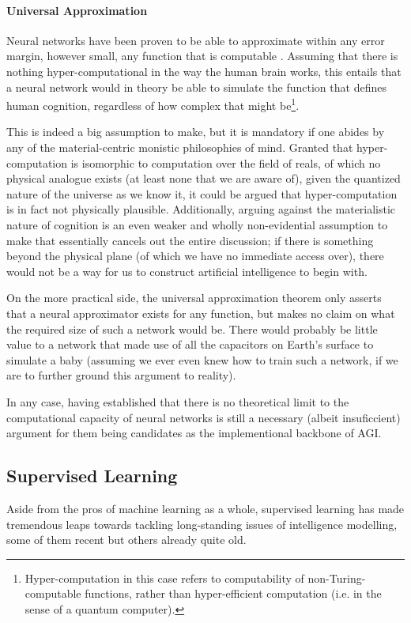 \documentclass[]{article}
\begin{document}
\paragraph{Universal Approximation}
Neural networks have been proven to be able to approximate within any error margin, however small, any function that is computable \cite{Cybenko1989} . Assuming that there is nothing hyper-computational in the way the human brain works, this entails that a neural network would in theory be able to simulate the function that defines human cognition, regardless of how complex that might be\footnote{Hyper-computation in this case refers to computability of non-Turing-computable functions, rather than hyper-efficient computation (i.e. in the sense of a quantum computer).}. 

This is indeed a big assumption to make, but it is mandatory if one abides by any of the material-centric monistic philosophies of mind. Granted that hyper-computation is isomorphic to computation over the field of reals, of which no physical analogue exists (at least none that we are aware of), given the quantized nature of the universe as we know it, it could be argued that hyper-computation is in fact not physically plausible. Additionally, arguing against the materialistic nature of cognition is an even weaker and wholly non-evidential assumption to make that essentially cancels out the entire discussion; if there is something beyond the physical plane (of which we have no immediate access over), there would not be a way for us to construct artificial intelligence to begin with.

On the more practical side, the universal approximation theorem only asserts that a neural approximator exists for any function, but makes no claim on what the required size of such a network would be. There would probably be little value to a network that made use of all the capacitors on Earth's surface to simulate a baby (assuming we ever even knew how to train such a network, if we are to further ground this argument to reality). 

In any case, having established that there is no theoretical limit to the computational capacity of neural networks is still a necessary (albeit insuficcient) argument for them being candidates as the implementional backbone of AGI.

\subsection{Supervised Learning}
Aside from the pros of machine learning as a whole, supervised learning has made tremendous leaps towards tackling long-standing issues of intelligence modelling, some of them recent but others already quite old.
\end{document}
